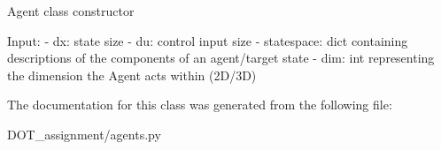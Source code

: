 \begin{DoxyVerb}Agent class constructor

Input:
- dx:                   state size
- du:                   control input size
- statespace:           dict containing descriptions of the components of an agent/target state
- dim:                  int representing the dimension the Agent acts within (2D/3D)\end{DoxyVerb}
 

The documentation for this class was generated from the following file\+:\begin{DoxyCompactItemize}
\item 
D\+O\+T\+\_\+assignment/agents.\+py\end{DoxyCompactItemize}
